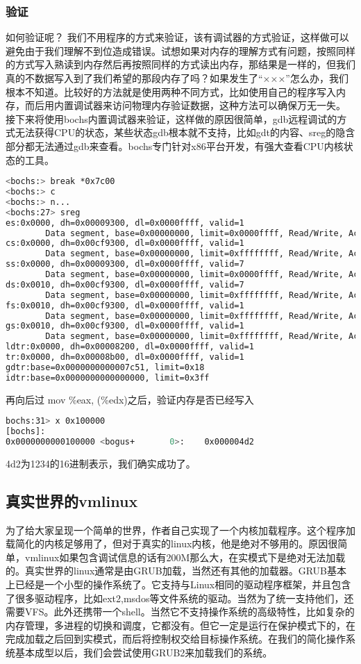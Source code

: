 \subsubsection{验证}
如何验证呢？ 我们不用程序的方式来验证，该有调试器的方式验证，这样做可以避免由于我们理解不到位造成错误。试想如果对内存的理解方式有问题，按照同样的方式写入熟读到内存然后再按照同样的方式读出内存，那结果是一样的，但我们真的不数据写入到了我们希望的那段内存了吗？如果发生了“×××”怎么办，我们根本不知道。比较好的方法就是使用两种不同方式，比如使用自己的程序写入内存，而后用内置调试器来访问物理内存验证数据，这种方法可以确保万无一失。
接下来将使用bochs内置调试器来验证，这样做的原因很简单，gdb远程调试的方式无法获得CPU的状态，某些状态gdb根本就不支持，比如gdt的内容、sreg的隐含部分都无法通过gdb来查看。bochs专门针对x86平台开发，有强大查看CPU内核状态的工具。
\begin{lstlisting}[language=bash]
<bochs:> break *0x7c00
<bochs:> c
<bochs:> n...
<bochs:27> sreg
es:0x0000, dh=0x00009300, dl=0x0000ffff, valid=1
        Data segment, base=0x00000000, limit=0x0000ffff, Read/Write, Accessed
cs:0x0000, dh=0x00cf9300, dl=0x0000ffff, valid=1
        Data segment, base=0x00000000, limit=0xffffffff, Read/Write, Accessed
ss:0x0000, dh=0x00009300, dl=0x0000ffff, valid=7
        Data segment, base=0x00000000, limit=0x0000ffff, Read/Write, Accessed
ds:0x0010, dh=0x00cf9300, dl=0x0000ffff, valid=7
        Data segment, base=0x00000000, limit=0xffffffff, Read/Write, Accessed
fs:0x0010, dh=0x00cf9300, dl=0x0000ffff, valid=1
        Data segment, base=0x00000000, limit=0xffffffff, Read/Write, Accessed
gs:0x0010, dh=0x00cf9300, dl=0x0000ffff, valid=1
        Data segment, base=0x00000000, limit=0xffffffff, Read/Write, Accessed
ldtr:0x0000, dh=0x00008200, dl=0x0000ffff, valid=1
tr:0x0000, dh=0x00008b00, dl=0x0000ffff, valid=1
gdtr:base=0x0000000000007c51, limit=0x18
idtr:base=0x0000000000000000, limit=0x3ff
\end{lstlisting}

再向后过 mov \%eax, (\%edx)之后，验证内存是否已经写入
\begin{lstlisting}[language=bash]
bochs:31> x 0x100000
[bochs]:
0x0000000000100000 <bogus+       0>:    0x000004d2
\end{lstlisting}
4d2为1234的16进制表示，我们确实成功了。

\subsection{真实世界的vmlinux}
为了给大家呈现一个简单的世界，作者自己实现了一个内核加载程序。这个程序加载简化的内核足够用了，但对于真实的linux内核，他是绝对不够用的。原因很简单，vmlinux如果包含调试信息的话有200M那么大，在实模式下是绝对无法加载的。真实世界的linux通常是由GRUB加载，当然还有其他的加载器。GRUB基本上已经是一个小型的操作系统了。它支持与Linux相同的驱动程序框架，并且包含了很多驱动程序，比如ext2,msdos等文件系统的驱动。当然为了统一支持他们，还需要VFS。此外还携带一个shell。当然它不支持操作系统的高级特性，比如复杂的内存管理，多进程的切换和调度，它都没有。但它一定是运行在保护模式下的，在完成加载之后回到实模式，而后将控制权交给目标操作系统。在我们的简化操作系统基本成型以后，我们会尝试使用GRUB2来加载我们的系统。
